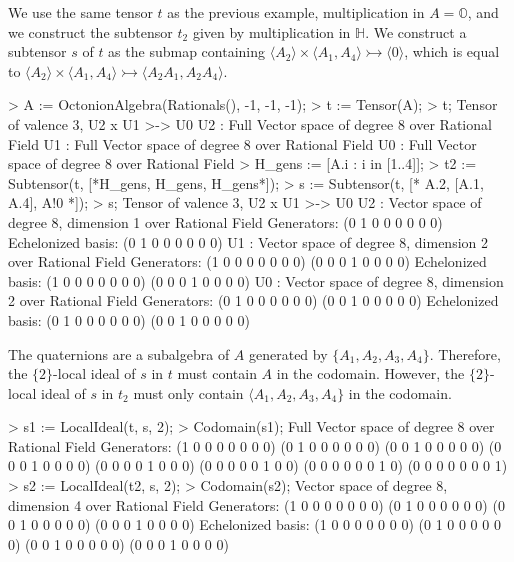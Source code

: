 \begin{example}[LocalIdeals]

We use the same tensor $t$ as the previous example, multiplication in
$A=\mathbb{O}$, and we construct the subtensor $t_2$ given by multiplication in
$\mathbb{H}$. We construct a subtensor $s$ of $t$ as the submap containing
$\langle A_2\rangle \times \langle A_1, A_4\rangle \rightarrowtail \langle
0\rangle$, which is equal to  $\langle A_2\rangle \times \langle A_1, A_4\rangle
\rightarrowtail \langle A_2A_1, A_2A_4\rangle$.
\begin{code}
> A := OctonionAlgebra(Rationals(), -1, -1, -1);
> t := Tensor(A);
> t;
Tensor of valence 3, U2 x U1 >-> U0
U2 : Full Vector space of degree 8 over Rational Field
U1 : Full Vector space of degree 8 over Rational Field
U0 : Full Vector space of degree 8 over Rational Field
> H_gens := [A.i : i in [1..4]];
> t2 := Subtensor(t, [*H_gens, H_gens, H_gens*]);
> s := Subtensor(t, [* A.2, [A.1, A.4], A!0 *]);
> s;
Tensor of valence 3, U2 x U1 >-> U0
U2 : Vector space of degree 8, dimension 1 over Rational Field
Generators:
(0 1 0 0 0 0 0 0)
Echelonized basis:
(0 1 0 0 0 0 0 0)
U1 : Vector space of degree 8, dimension 2 over Rational Field
Generators:
(1 0 0 0 0 0 0 0)
(0 0 0 1 0 0 0 0)
Echelonized basis:
(1 0 0 0 0 0 0 0)
(0 0 0 1 0 0 0 0)
U0 : Vector space of degree 8, dimension 2 over Rational Field
Generators:
(0 1 0 0 0 0 0 0)
(0 0 1 0 0 0 0 0)
Echelonized basis:
(0 1 0 0 0 0 0 0)
(0 0 1 0 0 0 0 0)
\end{code}

The quaternions are a subalgebra of $A$ generated by $\{A_1,A_2,A_3,A_4\}$.
Therefore, the $\{2\}$-local ideal of $s$ in $t$ must contain $A$ in the
codomain. However, the $\{2\}$-local ideal of $s$ in $t_2$ must only contain
$\langle A_1, A_2, A_3, A_4\}$ in the codomain.
\begin{code}
> s1 := LocalIdeal(t, s, {2});
> Codomain(s1);
Full Vector space of degree 8 over Rational Field
Generators:
(1 0 0 0 0 0 0 0)
(0 1 0 0 0 0 0 0)
(0 0 1 0 0 0 0 0)
(0 0 0 1 0 0 0 0)
(0 0 0 0 1 0 0 0)
(0 0 0 0 0 1 0 0)
(0 0 0 0 0 0 1 0)
(0 0 0 0 0 0 0 1)
> s2 := LocalIdeal(t2, s, {2});
> Codomain(s2);
Vector space of degree 8, dimension 4 over Rational Field
Generators:
(1 0 0 0 0 0 0 0)
(0 1 0 0 0 0 0 0)
(0 0 1 0 0 0 0 0)
(0 0 0 1 0 0 0 0)
Echelonized basis:
(1 0 0 0 0 0 0 0)
(0 1 0 0 0 0 0 0)
(0 0 1 0 0 0 0 0)
(0 0 0 1 0 0 0 0)
\end{code}
\end{example}



